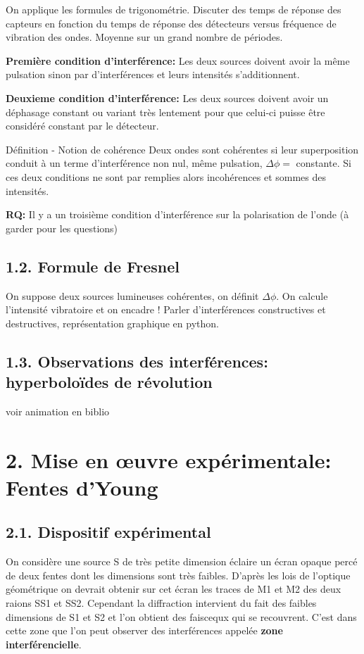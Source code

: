 \documentclass[french, a4paper, 10pt, twocolumn, landscape]{article}
\begin{document}
On applique les formules de trigonométrie. Discuter des temps de réponse des capteurs en fonction du temps de réponse des détecteurs versus fréquence de vibration des ondes. Moyenne sur un grand nombre de périodes.

\textbf{Première condition d'interférence:} Les deux sources doivent avoir la même pulsation sinon par d'interférences et leurs intensités s'additionnent.

\textbf{Deuxieme condition d'interférence:} Les deux sources doivent avoir un déphasage constant ou variant très lentement pour que celui-ci puisse être considéré constant par le détecteur.

\begin{definition}{Définition - Notion de cohérence}
    Deux ondes sont cohérentes si leur superposition conduit à un terme d'interférence non nul, même pulsation, $\Delta\phi=$ constante. Si ces deux conditions ne sont par remplies alors incohérences et sommes des intensités.
\end{definition}

\textbf{RQ:} Il y a un troisième condition d'interférence sur la polarisation de l'onde (à garder pour les questions)

\subsection*{1.2. Formule de Fresnel}
On suppose deux sources lumineuses cohérentes, on définit $\Delta\phi$. On  calcule l'intensité vibratoire et on encadre !  Parler d'interférences constructives et destructives, représentation graphique en python. 

\subsection*{1.3. Observations des interférences: hyperboloïdes de révolution}
voir animation en biblio

\section*{2. Mise en \oe uvre expérimentale: Fentes d'Young}

\subsection*{2.1. Dispositif expérimental}

On considère une source S de très petite dimension éclaire un écran opaque percé de deux fentes dont les dimensions sont très faibles. D'après les lois de l'optique géométrique on devrait obtenir sur cet écran les traces de M1 et M2 des deux raions SS1 et SS2. Cependant la diffraction intervient du fait des faibles dimensions de S1 et S2 et l'on obtient des faiscequx qui se recouvrent. C'est dans cette zone que l'on peut observer des interférences appelée \textbf{zone interférencielle}. 
\end{document}
